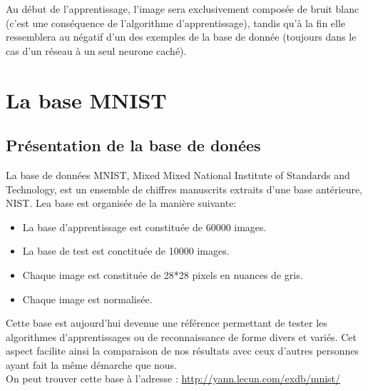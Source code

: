 \documentclass[a4paper,oneside]{report}
\begin{document}
                Au début de l'apprentissage, l'image sera exclusivement composée de bruit blanc (c'est une conséquence de l'algorithme d'apprentissage), tandis qu'à la fin elle ressemblera au négatif d'un des exemples de la base de donnée (toujours dans le cas d'un réseau à un seul neurone caché).


    \appendix

        \chapter{La base MNIST}

            \section{Présentation de la base de donées}

                La base de données MNIST, Mixed Mixed National Institute of Standards and Technology, est un ensemble de chiffres manuscrits extraits d'une base antérieure, NIST. Lea base est organisée de la manière suivante:

                \begin{itemize}
                    \item La base d'apprentissage est constituée de 60000 images.
                    \item La base de test est conctituée de 10000 images.
                    \item Chaque image est constituée de 28*28 pixels en nuances de gris.
                    \item Chaque image est normalisée.\\
                \end{itemize}

                Cette base est aujourd'hui devenue une référence permettant de tester les algorithmes d'apprentissages ou de reconnaissance de forme divers et variés. Cet aspect facilite ainsi la comparaison de nos résultats avec ceux d'autres personnes ayant fait la même démarche que nous.\\

                On peut trouver cette base à l'adresse : \url{http://yann.lecun.com/exdb/mnist/}
\end{document}
